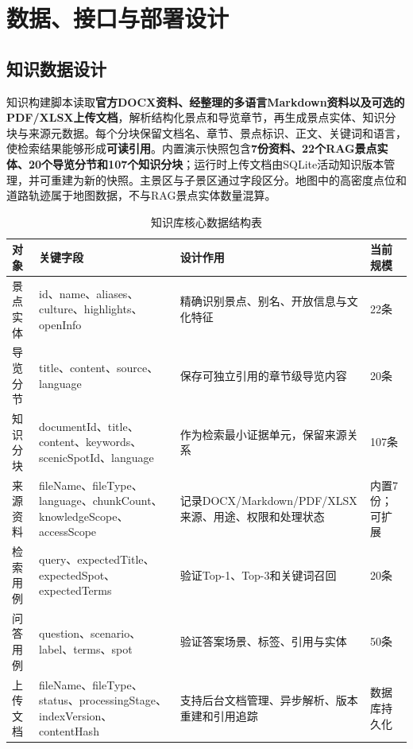 \chapter{数据、接口与部署设计}

\section{知识数据设计}

知识构建脚本读取\textbf{官方DOCX资料、经整理的多语言Markdown资料以及可选的PDF/XLSX上传文档}，解析结构化景点和导览章节，再生成景点实体、知识分块与来源元数据。每个分块保留文档名、章节、景点标识、正文、关键词和语言，使检索结果能够形成\textbf{可读引用}。内置演示快照包含\textbf{7份资料、22个RAG景点实体、20个导览分节和107个知识分块}；运行时上传文档由SQLite活动知识版本管理，并可重建为新的快照。主景区与子景区通过字段区分。地图中的高密度点位和道路轨迹属于地图数据，不与RAG景点实体数量混算。

\begin{table}[H]
  \centering
  \caption{知识库核心数据结构表}\label{tab:knowledge-model}
  \begin{tabularx}{\textwidth}{p{}p{}X p{}}
    \toprule
    对象 & 关键字段 & 设计作用 & 当前规模 \\
    \midrule
    景点实体 & id、name、aliases、culture、highlights、openInfo & 精确识别景点、别名、开放信息与文化特征 & 22条 \\
    导览分节 & title、content、source、language & 保存可独立引用的章节级导览内容 & 20条 \\
    知识分块 & documentId、title、content、keywords、scenicSpotId、language & 作为检索最小证据单元，保留来源关系 & 107条 \\
    来源资料 & fileName、fileType、language、chunkCount、knowledgeScope、accessScope & 记录DOCX/Markdown/PDF/XLSX来源、用途、权限和处理状态 & 内置7份；可扩展 \\
    检索用例 & query、expectedTitle、expectedSpot、expectedTerms & 验证Top-1、Top-3和关键词召回 & 20条 \\
    问答用例 & question、scenario、label、terms、spot & 验证答案场景、标签、引用与实体 & 50条 \\
    上传文档 & fileName、fileType、status、processingStage、indexVersion、contentHash & 支持后台文档管理、异步解析、版本重建和引用追踪 & 数据库持久化 \\
    \bottomrule
  \end{tabularx}
\end{table}

